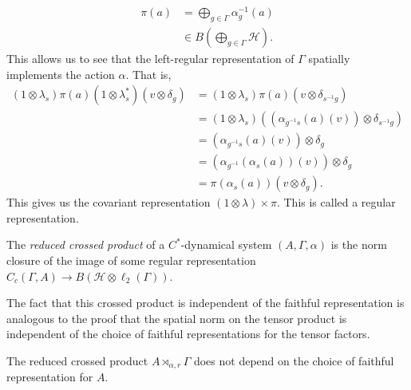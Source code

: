 \documentclass[10pt]{mypackage}
\begin{document}
\begin{align*}
  \pi(a) &= \bigoplus_{g\in\Gamma}\alpha_g^{-1}\left( a \right)\\
         &\in B\left( \bigoplus_{g\in\Gamma}\mathcal{H} \right).
\end{align*}
This allows us to see that the left-regular representation of $\Gamma$ spatially implements the action $\alpha$. That is,
\begin{align*}
  \left( 1\otimes\lambda_s \right)\pi(a)\left( 1\otimes \lambda_s^{\ast} \right)\left( v\otimes \delta_g \right) &= \left( 1\otimes\lambda_s \right)\pi(a)\left( v\otimes\delta_{s^{-1}g} \right)\\
                                                                                                                 &= \left( 1\otimes\lambda_s \right)\left( \left( \alpha_{g^{-1}s}(a)(v) \right)\otimes \delta_{s^{-1}g} \right)\\
                                                                                                                 &= \left( \alpha_{g^{-1}s}(a)(v) \right)\otimes \delta_g\\
                                                                                                                 &= \left( \alpha_{g^{-1}}\left( \alpha_s(a) \right)(v) \right)\otimes\delta_g\\
                                                                                                                 &= \pi\left( \alpha_s(a) \right)\left( v\otimes \delta_g \right).
\end{align*}
This gives us the covariant representation $\left( 1\otimes\lambda \right)\times \pi$. This is called a regular representation.
\begin{definition}
  The \textit{reduced crossed product} of a $C^{\ast}$-dynamical system $\left( A,\Gamma,\alpha \right)$ is the norm closure of the image of some regular representation $C_c\left( \Gamma,A \right)\rightarrow B\left( \mathcal{H}\otimes \ell_2\left( \Gamma \right) \right)$.
\end{definition}
The fact that this crossed product is independent of the faithful representation is analogous to the proof that the spatial norm on the tensor product is independent of the choice of faithful representations for the tensor factors.
\begin{proposition}
  The reduced crossed product $A\rtimes_{\alpha,r} \Gamma$ does not depend on the choice of faithful representation for $A$.
\end{proposition}
\end{document}
